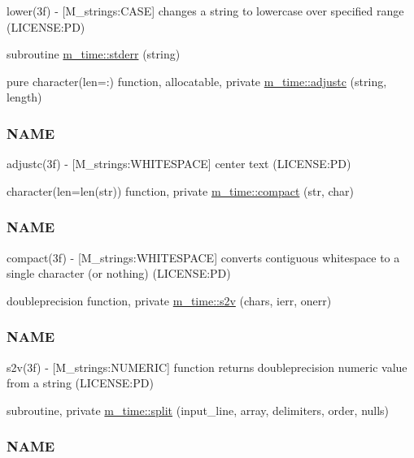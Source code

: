 \begin{DoxyCompactItemize}
\begin{DoxyCompactList}
lower(3f) -\/ \mbox{[}M\+\_\+strings\+:C\+A\+SE\mbox{]} changes a string to lowercase over specified range (L\+I\+C\+E\+N\+SE\+:PD) \end{DoxyCompactList}\item 
subroutine \mbox{\hyperlink{namespacem__time_ac729ead2b5aa4c756d52284cd7d22bf2}{m\+\_\+time\+::stderr}} (string)
\item 
pure character(len=\+:) function, allocatable, private \mbox{\hyperlink{namespacem__time_a9b165bc2207c694474bff6c7f56dfb09}{m\+\_\+time\+::adjustc}} (string, length)
\begin{DoxyCompactList}\small\item\em \subsubsection*{N\+A\+ME}

adjustc(3f) -\/ \mbox{[}M\+\_\+strings\+:W\+H\+I\+T\+E\+S\+P\+A\+CE\mbox{]} center text (L\+I\+C\+E\+N\+SE\+:PD) \end{DoxyCompactList}\item 
character(len=len(str)) function, private \mbox{\hyperlink{namespacem__time_a7dd8bfae3ed8ba85bf4de75bf120fe89}{m\+\_\+time\+::compact}} (str, char)
\begin{DoxyCompactList}\small\item\em \subsubsection*{N\+A\+ME}

compact(3f) -\/ \mbox{[}M\+\_\+strings\+:W\+H\+I\+T\+E\+S\+P\+A\+CE\mbox{]} converts contiguous whitespace to a single character (or nothing) (L\+I\+C\+E\+N\+SE\+:PD) \end{DoxyCompactList}\item 
doubleprecision function, private \mbox{\hyperlink{namespacem__time_a30c2f29f22d676ade9dff5ad6c35aae5}{m\+\_\+time\+::s2v}} (chars, ierr, onerr)
\begin{DoxyCompactList}\small\item\em \subsubsection*{N\+A\+ME}

s2v(3f) -\/ \mbox{[}M\+\_\+strings\+:N\+U\+M\+E\+R\+IC\mbox{]} function returns doubleprecision numeric value from a string (L\+I\+C\+E\+N\+SE\+:PD) \end{DoxyCompactList}\item 
subroutine, private \mbox{\hyperlink{namespacem__time_a16627f5dab7e40434531eed45cb3ea26}{m\+\_\+time\+::split}} (input\+\_\+line, array, delimiters, order, nulls)
\begin{DoxyCompactList}\small\item\em \subsubsection*{N\+A\+ME}


\end{DoxyCompactList}
\end{DoxyCompactItemize}
